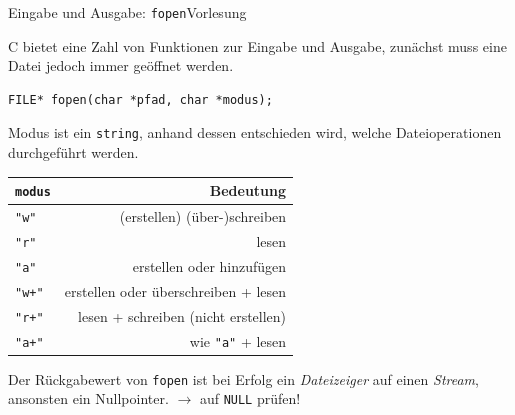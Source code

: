 \documentclass[xcolor=dvipsnames]{beamer}
\newcounter{lecturecounter}
\begin{document}
\begin{frame}[fragile]{Eingabe und Ausgabe: \texttt{fopen}}{Vorlesung }
  \begin{block}{}
    C bietet eine Zahl von Funktionen zur Eingabe und Ausgabe, zunächst muss eine Datei jedoch immer geöffnet werden.
  \end{block}
\begin{lstlisting}
FILE* fopen(char *pfad, char *modus);   
\end{lstlisting}
\begin{block}{}
Modus ist ein \texttt{string}, anhand dessen entschieden wird, welche Dateioperationen durchgeführt werden.
\end{block}
\centering
\small
  \begin{tabular}{lr}
    \hline
    \texttt{modus}  & Bedeutung                           \\\hline
    \verb|"w"|      & (erstellen) (über-)schreiben        \\
    \verb|"r"|      & lesen                               \\
    \verb|"a"|      & erstellen oder hinzufügen           \\
    \verb|"w+"|     & erstellen oder überschreiben + lesen\\
    \verb|"r+"|     & lesen + schreiben (nicht erstellen) \\
    \verb|"a+"|     & wie \verb|"a"| + lesen              \\
    \hline
  \end{tabular}
\begin{block}{}
  Der Rückgabewert von \texttt{fopen} ist bei Erfolg ein \emph{Dateizeiger} auf einen \emph{Stream}, ansonsten ein Nullpointer. $\rightarrow$ auf \texttt{NULL} prüfen!
\end{block}

\end{frame}
\end{document}
